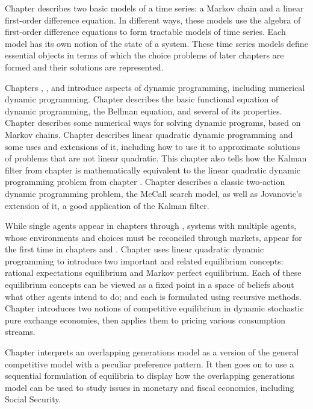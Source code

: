 Chapter  describes   two basic models of a time series:
a Markov chain and  a linear first-order difference equation.
In different ways, these models use the algebra of first-order
difference equations
to form tractable models of time series.  Each model
has its own notion of the state of a system.  These time
series models define essential   objects in terms of which
the choice problems of later chapters are formed and their
solutions are represented.

  Chapters , , and 
  introduce aspects of dynamic programming, including
numerical dynamic programming. Chapter  describes the
basic functional equation of dynamic programming, the Bellman
equation, and several of its properties. Chapter 
describes some numerical ways for solving dynamic programs, based
on Markov chains.  Chapter  describes linear
quadratic dynamic programming and some uses and extensions of it,
including how to use it to approximate solutions of problems that
are not linear quadratic. This chapter also tells how the Kalman
filter from chapter  is
mathematically equivalent to
\newpage
\noindent the linear quadratic dynamic
programming problem from chapter . Chapter 
describes a classic two-action dynamic programming problem, the
McCall search model, as well as Jovanovic's extension of it, a
good application of  the Kalman filter.


  While single agents appear in   chapters   through
,
systems with multiple agents, whose environments  and choices must
be reconciled through markets,  appear for the first time
in chapters  and .
 Chapter  uses linear quadratic dynamic
programming to introduce two important and related equilibrium concepts:
 rational expectations equilibrium and  Markov perfect
equilibrium.    Each of these equilibrium
concepts can be viewed as a fixed point in a space of beliefs
about what other agents intend to do;  and each    is
formulated using recursive methods.
Chapter  introduces two notions of competitive equilibrium
in dynamic stochastic pure exchange  economies, then applies
them to pricing various  consumption streams.

Chapter   interprets  an overlapping generations model
as a version of the general competitive  model with
a peculiar preference pattern.        It then goes on to
use a sequential formulation of equilibria to display
how the overlapping generations model can be used to study
issues in monetary and fiscal economics, including Social Security.

